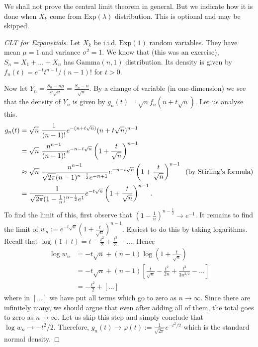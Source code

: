 \documentclass[preprint,  11pt]{amsart}
\theoremstyle{plain} %
\theoremstyle{definition} %
\begin{document}

%


We shall not prove the central limit theorem in general. But we indicate how it is done when $X_{k}$ come from $\mbox{Exp}(\lambda)$ distribution. This is optional and may be skipped.

\begin{proof}[CLT for Exponetials] Let $X_{k}$ be i.i.d. $\mbox{Exp}(1)$ random variables. They have mean $\mu=1$ and variance ${\sigma}^{2}=1$. We know that (this was an exercise), $S_{n}=X_{1}+\ldots +X_{n}$ has $\mbox{Gamma}(n,1)$ distribution. Its density is given by $f_{n}(t)=e^{-t}t^{n-1}/(n-1)!$ for $t>0$.

Now let $Y_{n}=\frac{S_{n}-n\mu}{{\sigma}\sqrt{n}}=\frac{S_{n}-n}{\sqrt{n}}$. By a change of variable (in one-dimension) we see that the density of $Y_{n}$ is given by $g_{n}(t)=\sqrt{n}f_{n}(n+t\sqrt{n})$. Let us analyse this.
\begin{align*}
g_{n}(t) &= \sqrt{n}\ \frac{1}{(n-1)!}e^{-(n+t\sqrt{n})}(n+t\sqrt{n})^{n-1}  \\
&= \sqrt{n}\ \frac{n^{n-1}}{(n-1)!}e^{-n-t\sqrt{n}}\left(1+\frac{t}{\sqrt{n}}\right)^{n-1} \\
&\approx \sqrt{n}\ \frac{n^{n-1}}{\sqrt{2\pi}(n-1)^{n-\frac{1}{2}}e^{-n+1}}e^{-n-t\sqrt{n}}\left(1+\frac{t}{\sqrt{n}}\right)^{n-1} \hspace{2mm}(\mbox{by Stirling's formula})\\
&= \frac{1}{\sqrt{2\pi}(1-\frac{1}{n})^{n-\frac{1}{2}}e^{1}}e^{-t\sqrt{n}}\left(1+\frac{t}{\sqrt{n}}\right)^{n-1}.
\end{align*}
To find the limit of this, first observe that $(1-\frac{1}{n})^{n-\frac{1}{2}}\rightarrow e^{-1}$. It remains to find the limit of $w_{n}:=e^{-t\sqrt{n}}\left(1+\frac{t}{\sqrt{n}}\right)^{n-1}$. Easiest to do this by taking logarithms. Recall that $\log(1+t)=t-\frac{t^{2}}{2}+\frac{t^{3}}{3}-\ldots$. Hence
\begin{align*}
\log w_{n} &= -t\sqrt{n} + (n-1)\log\left(1+\frac{t}{\sqrt{n}}\right) \\
&= -t\sqrt{n} + (n-1)\left[ \frac{t}{\sqrt{n}}-\frac{t^{2}}{2n}+\frac{t^{3}}{3n^{3/2}}-\ldots\right] \\
&= -\frac{t^{2}}{2}+[\ldots]
\end{align*}
where in $[\ldots]$ we have put all terms which go to zero as $n\rightarrow \infty$. Since there are infinitely many, we should argue that even after adding all of them, the total goes to zero as $n\rightarrow \infty$. Let us skip this step and simply conclude that $\log w_{n}\rightarrow -t^{2}/2$. Therefore, $g_{n}(t) \rightarrow \varphi(t):=\frac{1}{\sqrt{2\pi}}e^{-t^{2}/2}$ which is the standard normal density.


\end{proof}
\end{document}
